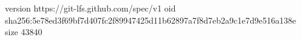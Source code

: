 version https://git-lfs.github.com/spec/v1
oid sha256:5e78ed3f69bf7d407fc2f89947425d11b62897a7f8d7eb2a9c1e7d9e516a138e
size 43840
